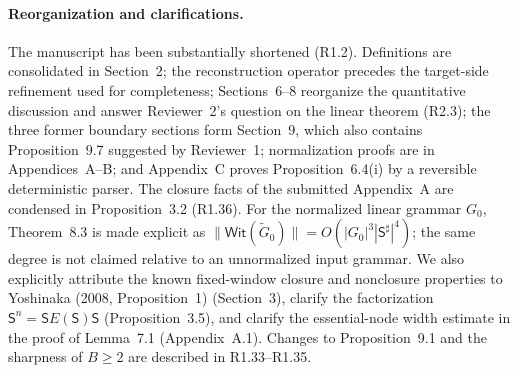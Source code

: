\documentclass[
  10pt,
  a4paper,
]{article}
\begin{document}
\paragraph{Reorganization and clarifications.}
The manuscript has been substantially shortened (R1.2). Definitions are
consolidated in Section~2; the reconstruction operator precedes the
target-side refinement used for completeness; Sections~6--8 reorganize
the quantitative discussion and answer Reviewer~2's question on the linear
theorem (R2.3); the three former boundary sections form Section~9, which
also contains Proposition~9.7 suggested by Reviewer~1; normalization
proofs are in Appendices~A--B; and Appendix~C proves
Proposition~6.4(i) by a reversible deterministic parser. The closure facts
of the submitted Appendix~A are condensed in Proposition~3.2 (R1.36).
For the normalized linear grammar $G_0$, Theorem~8.3 is made explicit as
$\|\mathsf{Wit}(\widetilde G_0)\|=O(|G_0|^3|\mathsf S^\sharp|^4)$; the same degree is
not claimed relative to an unnormalized input grammar.
We also explicitly attribute the known fixed-window closure and
nonclosure properties to Yoshinaka (2008, Proposition~1)
(Section~3), clarify the factorization
$\mathsf{S}^n=\mathsf{S} E(\mathsf{S})\mathsf{S}$ (Proposition~3.5), and clarify the
essential-node width estimate in the proof of Lemma~7.1 (Appendix~A.1).
Changes to Proposition~9.1 and the sharpness of $B\ge2$ are described
in R1.33--R1.35.
\end{document}
